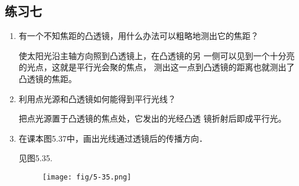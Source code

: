 \subsection{练习七}
\begin{enumerate}
    \item 有一个不知焦距的凸透镜，用什么办法可以粗略地测出它的焦距？

    \begin{solution}
使太阳光沿主轴方向照到凸透镜上，在凸透镜的另
一侧可以见到一个十分亮的光点，这就是平行光会聚的焦点，
测出这一点到凸透镜的距离也就测出了凸透镜的焦距。
    \end{solution}
    \item 利用点光源和凸透镜如何能得到平行光线？

    \begin{solution}
把点光源置于凸透镜的焦点处，它发出的光经凸透
镜折射后即成平行光。
    \end{solution}
    \item 在课本图5.37中，画出光线通过透镜后的传播方向．

    \begin{solution}
        见图5.35.
\begin{figure}[htp]
    \centering
    \texttt{[image: fig/5-35.png]}
    \caption{}
\end{figure}
    \end{solution}
\end{enumerate}





